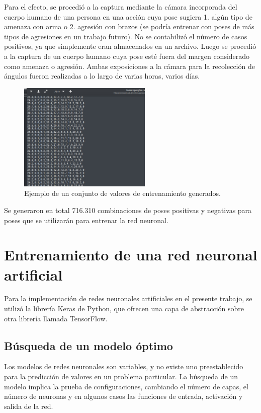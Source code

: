 \documentclass[a4paper,12pt,oneside,spanish]{book}
\begin{document}
Para el efecto, se procedió a la captura mediante la cámara incorporada del cuerpo humano de una persona en una acción cuya pose sugiera 1. algún tipo de amenaza con arma o 2. agresión con brazos (se podría entrenar con poses de más tipos de agresiones en un trabajo futuro). No se contabilizó el número de casos positivos, ya que simplemente eran almacenados en un archivo. Luego se procedió a la captura de un cuerpo humano cuya pose esté fuera del margen considerado como amenaza o agresión. Ambas exposiciones a la cámara para la recolección de ángulos fueron realizadas a lo largo de varias horas, varios días.\par

\begin{figure}[h!]
	\includegraphics[width=180pt]{Imagenes/dataset2.jpg}
	\centering	
	\caption{Ejemplo de un conjunto de valores de entrenamiento generados.}
	\label{fig:dataset2}
\end{figure}

Se generaron en total 716.310 combinaciones de poses positivas y negativas para poses que se utilizarán para entrenar la red neuronal.

\section{Entrenamiento de una red neuronal artificial}\label{entrenamiento}
Para la implementación de redes neuronales artificiales en el presente trabajo, se utilizó la librería Keras de Python, que ofrecen una capa de abstracción sobre otra librería llamada TensorFlow.\par

\subsection{Búsqueda de un modelo óptimo}
Los modelos de redes neuronales son variables, y no existe uno preestablecido para la predicción de valores en un problema particular. La búsqueda de un modelo implica la prueba de configuraciones, cambiando el número de capas, el número de neuronas y en algunos casos las funciones de entrada, activación y salida de la red.\par
\end{document}
